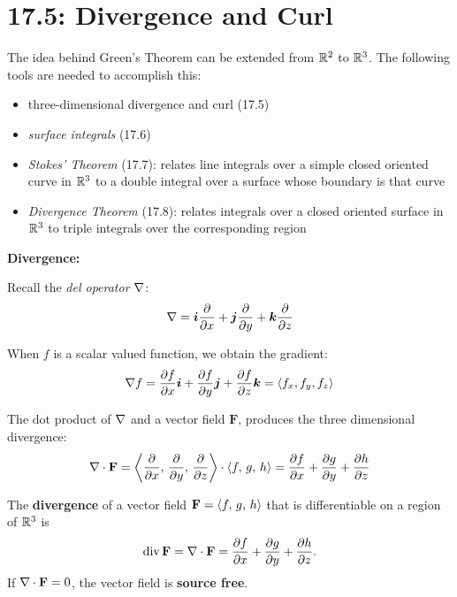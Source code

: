 \documentclass[../mathNotesPreamble]{subfiles}
\begin{document}
\section{17.5: Divergence and Curl}

  The idea behind Green's Theorem can be extended from $\mathbb{R}^2$ to $\mathbb{R}^3$. The following tools are needed to accomplish this:
  \begin{itemize}
    \item 
      three-dimensional divergence and curl (17.5)
    \item 
      \textit{surface integrals} (17.6)
    \item 
      \textit{Stokes' Theorem} (17.7): relates line integrals over a simple closed oriented curve in $\mathbb{R}^3$ to a double integral over a surface whose boundary is that curve
    \item 
      \textit{Divergence Theorem} (17.8): relates integrals over a closed oriented surface in $\mathbb{R}^3$ to triple integrals over the corresponding region
  \end{itemize}

  \noindent 
  \textbf{Divergence:}

  Recall the \textit{del operator} $\nabla$:
    \[\nabla={\bm{i}}\frac{\partial}{\partial x}+{\bm{j}}\frac{\partial}{\partial y}+{\bm{k}}\frac{\partial}{\partial z}\]

  When $f$ is a scalar valued function, we obtain the gradient:
    \[\nabla f=\frac{\partial f}{\partial x}{\bm{i}}+\frac{\partial f}{\partial y}{\bm{j}}+\frac{\partial f}{\partial z}{\bm{k}}={\left\langle f_x, f_y, f_z \right\rangle}\]

  The dot product of $\nabla$ and a vector field $\mathbf F$, produces the three dimensional divergence:
    \[\nabla\cdot\mathbf F={\left\langle \frac{\partial}{\partial x},\,\frac{\partial}{\partial y},\,\frac{\partial}{\partial z} \right\rangle}\cdot{\left\langle f,\,g,\,h \right\rangle}=\frac{\partial f}{\partial x}+\frac{\partial g}{\partial y}+\frac{\partial h}{\partial z}\]

  \begin{defn*}
    The \textbf{divergence} of a vector field $\mathbf F={\left\langle f,\,g,\,h \right\rangle}$ that is differentiable on a region of $\mathbb{R}^3$ is 
      \[\operatorname{div} \mathbf F=\nabla\cdot\mathbf F=\frac{\partial f}{\partial x}+\frac{\partial g}{\partial y}+\frac{\partial h}{\partial z}.\]
    If $\nabla\cdot\mathbf F=0$, the vector field is \textbf{source free}.
  \end{defn*}
  \pagebreak
\end{document}

